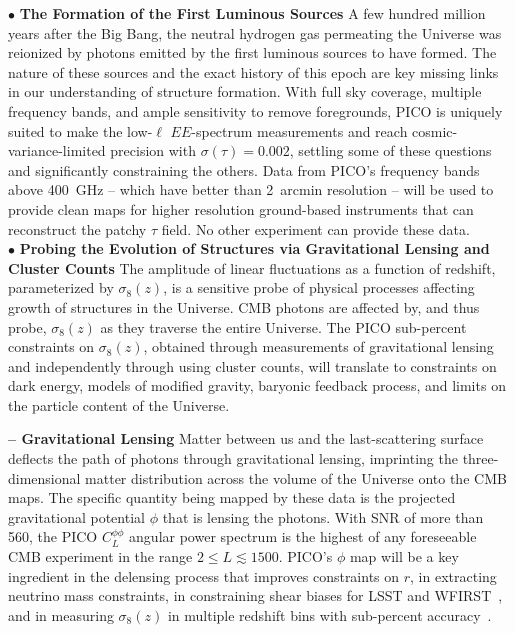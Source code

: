 \documentclass[PICOAPC.tex]{subfiles}
\begin{document}
 
$\bullet$ {\bf The Formation of the First Luminous Sources} \hspace{0.1in} \label{sec:luminoussources}  A few hundred million years after the Big Bang, the neutral hydrogen gas permeating the Universe was reionized by photons emitted by the first luminous sources to have formed.  The nature of these sources and the exact history of this epoch are key missing links in our understanding of structure formation.  With full sky coverage, multiple frequency bands, and ample sensitivity to remove foregrounds, PICO is uniquely suited to make the low-$\ell$ $EE$-spectrum measurements and reach cosmic-variance-limited precision with $\sigma(\tau)=0.002$, settling some of these questions and significantly constraining the others. Data from PICO's frequency bands above 400~GHz -- which have better than 2~arcmin resolution  -- will be used to provide clean maps for higher resolution ground-based instruments that can reconstruct the patchy $\tau$ field. No other experiment can provide these data. \\
$\bullet$ {\bf Probing the Evolution of Structures via Gravitational Lensing and Cluster Counts} \hspace{0.1in} \label{sec:gravitationallensing}   The amplitude of linear fluctuations as a function of redshift, parameterized by $\sigma_8(z)$, is a sensitive probe of physical processes affecting growth of structures in the Universe. \ac{CMB} photons are affected by, and thus probe, $\sigma_{8}(z)$ as they traverse the entire Universe. The PICO sub-percent constraints on $\sigma_8(z)$, obtained through measurements of gravitational lensing and independently through using cluster counts, will translate to constraints on dark energy, models of modified gravity, baryonic feedback process, and limits on the particle content of the Universe. 

{\bf -- Gravitational Lensing} \hspace{0.1in} \label{lensing} Matter between us and the last-scattering surface deflects the path of photons through gravitational lensing, imprinting the three-dimensional matter distribution across the volume of the Universe onto the CMB maps. The specific quantity being mapped by these data is the projected gravitational potential $\phi$ that is lensing the photons. With \ac{SNR} of more than 560, the PICO $C_{L}^{\phi \phi}$ angular power spectrum is the highest of any foreseeable CMB experiment in the range $2 \leq L \lesssim 1500$. 
PICO's $\phi$ map will be a key ingredient in the delensing process that improves constraints on $r$, in extracting neutrino mass constraints, in constraining shear biases for LSST and WFIRST~\cite{schaan}, and in measuring $\sigma_{8}(z)$ in multiple redshift bins with sub-percent accuracy~\citep{pico_report}. 
\end{document}
